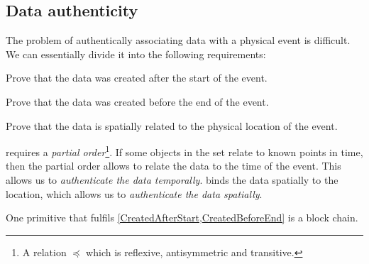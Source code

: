 \subsection{Data authenticity}
\label{DataAuthenticity}

The problem of authentically associating data with a physical event is 
difficult.
We can essentially divide it into the following requirements:
\begin{frame}
\begin{requirements}[A]
  \item\label{CreatedAfterStart} Prove that the data was created after the 
    start of the event.
  \item\label{CreatedBeforeEnd} Prove that the data was created before the end 
    of the event.
  \item\label{SpatiallyRelated} Prove that the data is spatially related to the 
    physical location of the event.
\end{requirements} %

\pause

\end{frame}
 requires a \emph{partial 
  order}\footnote{%
  A relation \(\preceq\) which is reflexive, antisymmetric and transitive.
}.
If some objects in the set relate to known points in time, then the partial 
order allows to relate the data to the time of the event.
This allows us to \emph{authenticate the data temporally}.
 binds the data spatially to the location, which allows 
us to \emph{authenticate the data spatially}.

One primitive that fulfils \cref{CreatedAfterStart,CreatedBeforeEnd} is a block 
chain.

